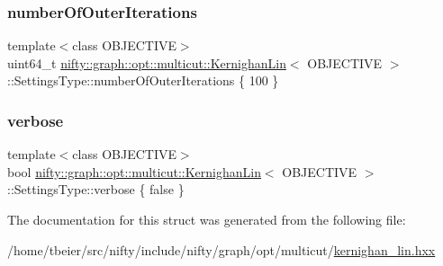 \subsubsection{\texorpdfstring{number\+Of\+Outer\+Iterations}{numberOfOuterIterations}}
{\footnotesize\ttfamily template$<$class O\+B\+J\+E\+C\+T\+I\+VE$>$ \\
uint64\+\_\+t \hyperlink{classnifty_1_1graph_1_1opt_1_1multicut_1_1KernighanLin}{nifty\+::graph\+::opt\+::multicut\+::\+Kernighan\+Lin}$<$ O\+B\+J\+E\+C\+T\+I\+VE $>$\+::Settings\+Type\+::number\+Of\+Outer\+Iterations \{ 100 \}}

\mbox{\label{structnifty_1_1graph_1_1opt_1_1multicut_1_1KernighanLin_1_1SettingsType_ad2060a212e720e3bd256717325a963ba}} 
\subsubsection{\texorpdfstring{verbose}{verbose}}
{\footnotesize\ttfamily template$<$class O\+B\+J\+E\+C\+T\+I\+VE$>$ \\
bool \hyperlink{classnifty_1_1graph_1_1opt_1_1multicut_1_1KernighanLin}{nifty\+::graph\+::opt\+::multicut\+::\+Kernighan\+Lin}$<$ O\+B\+J\+E\+C\+T\+I\+VE $>$\+::Settings\+Type\+::verbose \{ false \}}



The documentation for this struct was generated from the following file\+:\begin{DoxyCompactItemize}
\item 
/home/tbeier/src/nifty/include/nifty/graph/opt/multicut/\hyperlink{kernighan__lin_8hxx}{kernighan\+\_\+lin.\+hxx}\end{DoxyCompactItemize}
